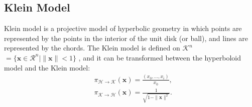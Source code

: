 \subsection{Klein Model}
Klein model is a projective model of hyperbolic geometry in which points are represented by the points in the interior of the unit disk (or ball), and lines are represented by the chords. 
The Klein model is defined on $\mathcal{K}^n$ $= \{\mathbf{x} \in \mathcal{R}^n \mid \|\mathbf{x}\| < 1 \}$ , and it can be transformed between the hyperboloid model and the Klein model: 
\begin{equation}\label{equ:3}
\begin{aligned}
    &\pi_{\mathcal{H} \to \mathcal{K}}(\mathbf{x})=\frac{(x_0,...,x_i)}{x_{0}}, \\
    &\pi_{\mathcal{K} \to \mathcal{H}}(\mathbf{x})=\frac{1}{\sqrt{1-\| \mathbf{x} \|^2}}.
\end{aligned}
\end{equation}
